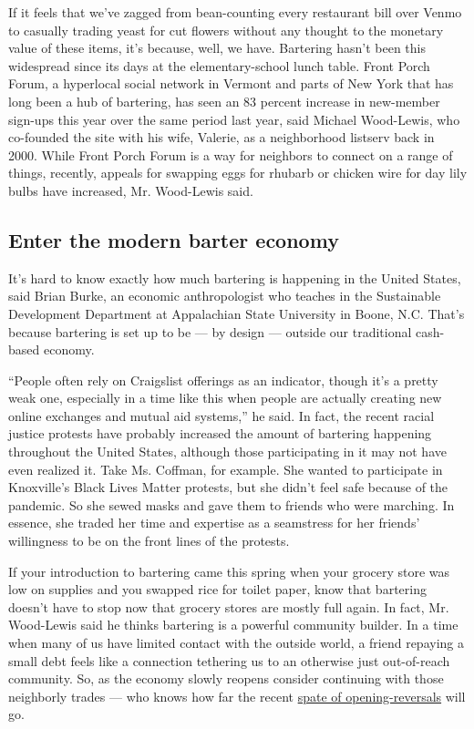 If it feels that we've zagged from bean-counting every restaurant bill
over Venmo to casually trading yeast for cut flowers without any thought
to the monetary value of these items, it's because, well, we have.
Bartering hasn't been this widespread since its days at the
elementary-school lunch table. Front Porch Forum, a hyperlocal social
network in Vermont and parts of New York that has long been a hub of
bartering, has seen an 83 percent increase in new-member sign-ups this
year over the same period last year, said Michael Wood-Lewis, who
co-founded the site with his wife, Valerie, as a neighborhood listserv
back in 2000. While Front Porch Forum is a way for neighbors to connect
on a range of things, recently, appeals for swapping eggs for rhubarb or
chicken wire for day lily bulbs have increased, Mr. Wood-Lewis said.

\hypertarget{enter-the-modern-barter-economy}{%
\subsection{Enter the modern barter
economy}\label{enter-the-modern-barter-economy}}

It's hard to know exactly how much bartering is happening in the United
States, said Brian Burke, an economic anthropologist who teaches in the
Sustainable Development Department at Appalachian State University in
Boone, N.C. That's because bartering is set up to be --- by design ---
outside our traditional cash-based economy.

``People often rely on Craigslist offerings as an indicator, though it's
a pretty weak one, especially in a time like this when people are
actually creating new online exchanges and mutual aid systems,'' he
said. In fact, the recent racial justice protests have probably
increased the amount of bartering happening throughout the United
States, although those participating in it may not have even realized
it. Take Ms. Coffman, for example. She wanted to participate in
Knoxville's Black Lives Matter protests, but she didn't feel safe
because of the pandemic. So she sewed masks and gave them to friends who
were marching. In essence, she traded her time and expertise as a
seamstress for her friends' willingness to be on the front lines of the
protests.

If your introduction to bartering came this spring when your grocery
store was low on supplies and you swapped rice for toilet paper, know
that bartering doesn't have to stop now that grocery stores are mostly
full again. In fact, Mr. Wood-Lewis said he thinks bartering is a
powerful community builder. In a time when many of us have limited
contact with the outside world, a friend repaying a small debt feels
like a connection tethering us to an otherwise just out-of-reach
community. So, as the economy slowly reopens consider continuing with
those neighborly trades --- who knows how far the recent
\href{https://www.nytimes.com/interactive/2020/us/states-reopen-map-coronavirus.html}{spate
of opening-reversals} will go.

